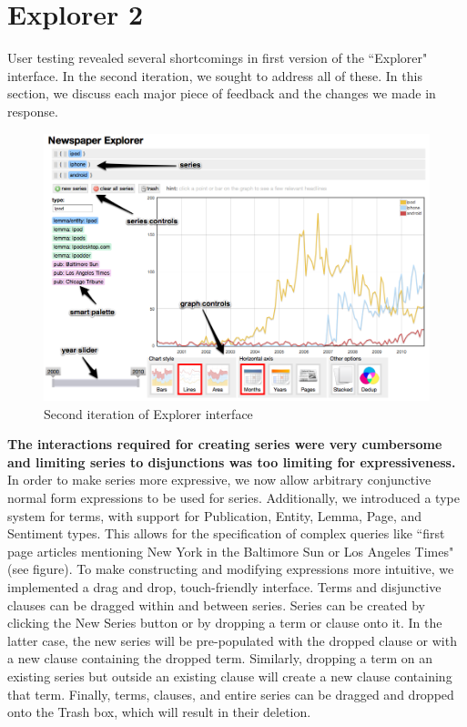 \section{Explorer 2}
User testing revealed several shortcomings in first version of the ``Explorer" interface. In the second iteration, we sought to address all of these. In this section, we discuss each major piece of feedback and the changes we made in response.

\begin{figure}[htb]
  \centerline{
    \includegraphics[scale=0.25]{figures/explorer-ui.png}
  }
  \caption{Second iteration of Explorer interface}
  \label{fig:explorer-ui}
\end{figure}

\textbf{The interactions required for creating series were very cumbersome and limiting series to disjunctions was too limiting for expressiveness.} In order to make series more expressive, we now allow arbitrary conjunctive normal form expressions to be used for series. Additionally, we introduced a type system for terms, with support for Publication, Entity, Lemma, Page, and Sentiment types. This allows for the specification of complex queries like ``first page articles mentioning New York in the Baltimore Sun or Los Angeles Times" (see figure).
To make constructing and modifying expressions more intuitive, we implemented a drag and drop, touch-friendly interface. Terms and disjunctive clauses can be dragged within and between series. Series can be created by clicking the New Series button or by dropping a term or clause onto it. In the latter case, the new series will be pre-populated with the dropped clause or with a new clause containing the dropped term. Similarly, dropping a term on an existing series but outside an existing clause will create a new clause containing that term. Finally, terms, clauses, and entire series can be dragged and dropped onto the Trash box, which will result in their deletion. 

